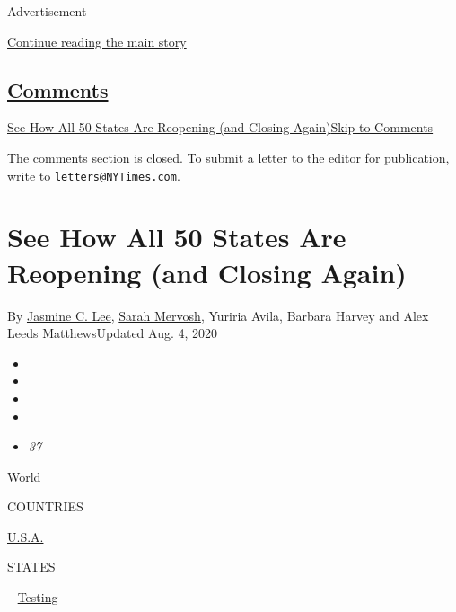 Advertisement

\protect\hyperlink{after-top}{Continue reading the main story}

\hypertarget{comments}{%
\subsection{\texorpdfstring{\protect\hyperlink{commentsContainer}{Comments}}{Comments}}\label{comments}}

\href{}{See How All 50 States Are Reopening (and Closing
Again)}\href{}{Skip to Comments}

The comments section is closed. To submit a letter to the editor for
publication, write to
\href{mailto:letters@NYTimes.com}{\nolinkurl{letters@NYTimes.com}}.

\hypertarget{see-how-all-50-states-are-reopening-and-closing-again}{%
\section{See How All 50 States Are Reopening (and Closing
Again)}\label{see-how-all-50-states-are-reopening-and-closing-again}}

By \href{https://www.nytimes3xbfgragh.onion/by/jasmine-c-lee}{Jasmine C.
Lee}, \href{https://www.nytimes3xbfgragh.onion/by/sarah-mervosh}{Sarah
Mervosh}, Yuriria Avila, Barbara Harvey and Alex Leeds MatthewsUpdated
Aug. 4, 2020

\begin{itemize}
\item
\item
\item
\item
\item
  \emph{37}
\end{itemize}

\href{https://www.nytimes3xbfgragh.onion/interactive/2020/world/coronavirus-maps.html}{World}~

COUNTRIES

\textbar{}
\href{https://www.nytimes3xbfgragh.onion/interactive/2020/us/coronavirus-us-cases.html}{U.S.A.}~

STATES

~
\href{https://www.nytimes3xbfgragh.onion/interactive/2020/us/coronavirus-testing.html}{Testing}

